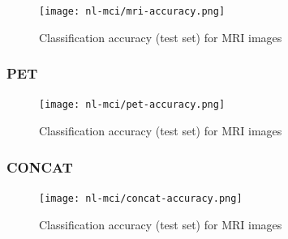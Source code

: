 \documentclass[12pt,a4paper]{article}
\begin{document}
\begin{figure}[H]
  \centering
  \texttt{[image: nl-mci/mri-accuracy.png]}
  \caption{\label{desigan}Classification accuracy (test set) for MRI images}
\end{figure}

\subsubsection{PET}

\begin{figure}[H]
  \centering
  \texttt{[image: nl-mci/pet-accuracy.png]}
  \caption{\label{afig:design}Classification accuracy (test set) for MRI images}
\end{figure}

\subsubsection{CONCAT}

\begin{figure}[H]
  \centering
  \texttt{[image: nl-mci/concat-accuracy.png]}
  \caption{\label{fffpig:design}Classification accuracy (test set) for MRI images}
\end{figure}
\end{document}

